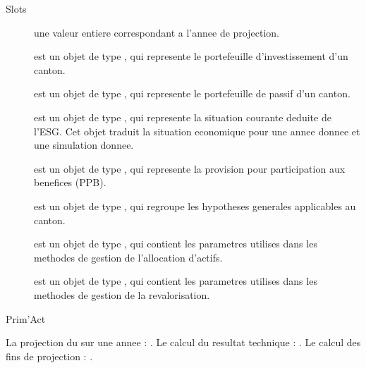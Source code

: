 \documentclass[a4paper]{book}
\begin{document}
\begin{Section}{Slots}

\begin{description}

\item[] une valeur entiere correspondant a l'annee de projection.

\item[] est un objet de type ,
qui represente le portefeuille d'investissement d'un canton.

\item[] est un objet de type ,
qui represente le portefeuille de passif d'un canton.

\item[] est un objet de type ,
qui represente la situation courante deduite de l'ESG. Cet objet traduit la situation economique
pour une annee donnee et une simulation donnee.

\item[] est un objet de type ,
qui represente la provision pour participation aux benefices (PPB).

\item[] est un objet de type ,
qui regroupe les hypotheses generales applicables au canton.

\item[] est un objet de type ,
qui contient les parametres utilises dans les methodes de gestion de l'allocation d'actifs.

\item[] est un objet de type ,
qui contient les parametres utilises dans les methodes de gestion de la revalorisation.

\end{description}
\end{Section}
%
\begin{Author}\relax
Prim'Act
\end{Author}
%
\begin{SeeAlso}\relax
La projection du  sur une annee : .
Le calcul du resultat technique : .
Le calcul des fins de projection : .
\end{SeeAlso}
\end{document}
